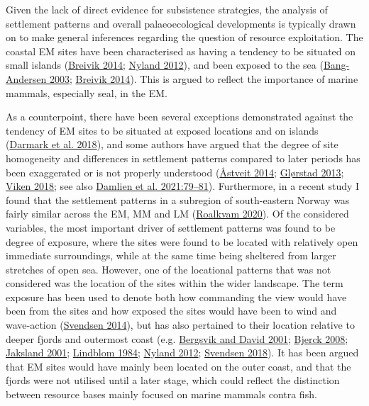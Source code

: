 \documentclass[
  12pt,
  a4paper,
  oneside]{book}
\begin{document}
Given the lack of direct evidence for subsistence strategies, the analysis of settlement patterns and overall palaeoecological developments is typically drawn on to make general inferences regarding the question of resource exploitation. The coastal EM sites have been characterised as having a tendency to be situated on small islands (\protect\hyperlink{ref-breivik2014}{Breivik 2014}; \protect\hyperlink{ref-nyland2012}{Nyland 2012}), and been exposed to the sea (\protect\hyperlink{ref-bang-andersen2003}{Bang-Andersen 2003}; \protect\hyperlink{ref-breivik2014}{Breivik 2014}). This is argued to reflect the importance of marine mammals, especially seal, in the EM.

As a counterpoint, there have been several exceptions demonstrated against the tendency of EM sites to be situated at exposed locations and on islands (\protect\hyperlink{ref-darmark2018}{Darmark et al. 2018}), and some authors have argued that the degree of site homogeneity and differences in settlement patterns compared to later periods has been exaggerated or is not properly understood (\protect\hyperlink{ref-uxe5stveit2014}{Åstveit 2014}; \protect\hyperlink{ref-glorstad2013}{Glørstad 2013}; \protect\hyperlink{ref-viken2018}{Viken 2018}; see also \protect\hyperlink{ref-damlien2021}{Damlien et al. 2021:79--81}). Furthermore, in a recent study I found that the settlement patterns in a subregion of south-eastern Norway was fairly similar across the EM, MM and LM (\protect\hyperlink{ref-roalkvam2020}{Roalkvam 2020}). Of the considered variables, the most important driver of settlement patterns was found to be degree of exposure, where the sites were found to be located with relatively open immediate surroundings, while at the same time being sheltered from larger stretches of open sea. However, one of the locational patterns that was not considered was the location of the sites within the wider landscape. The term exposure has been used to denote both how commanding the view would have been from the sites and how exposed the sites would have been to wind and wave-action (\protect\hyperlink{ref-svendsen2014}{Svendsen 2014}), but has also pertained to their location relative to deeper fjords and outermost coast (e.g. \protect\hyperlink{ref-bergsvik2001}{Bergsvik and David 2001}; \protect\hyperlink{ref-bjerck2008}{Bjerck 2008}; \protect\hyperlink{ref-jaksland2001}{Jaksland 2001}; \protect\hyperlink{ref-lindblom1984}{Lindblom 1984}; \protect\hyperlink{ref-nyland2012}{Nyland 2012}; \protect\hyperlink{ref-svendsen2018}{Svendsen 2018}). It has been argued that EM sites would have mainly been located on the outer coast, and that the fjords were not utilised until a later stage, which could reflect the distinction between resource bases mainly focused on marine mammals contra fish.
\end{document}
